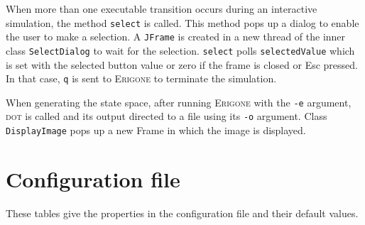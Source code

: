 \documentclass[11pt]{article}
\newcommand{\eri}{\textsc{Erigone}}
\newcommand{\p}[1]{\texttt{#1}}
\newcommand{\bu}[1]{\textsf{#1}}
\begin{document}
When more than one executable transition occurs during an interactive
simulation, the method \p{select} is called. This method pops up a
dialog to enable the user to make a selection. A \p{JFrame} is created
in a new thread of the inner class \p{SelectDialog} to wait for the
selection. \p{select} polls \p{selectedValue} which is set with the
selected button value or zero if the frame is closed or \bu{Esc}
pressed. In that case, \p{q} is sent to \eri{} to terminate the
simulation.

When generating the state space, after running \eri{} with the \p{-e}
argument, \textsc{dot} is called and its output directed to a file using
its \p{-o} argument. Class \p{DisplayImage} pops up a new Frame in
which the image is displayed.

\newpage

\appendix

\section{Configuration file}\label{a.cfg}

These tables give the properties in the configuration file and their
default values.
\end{document}
